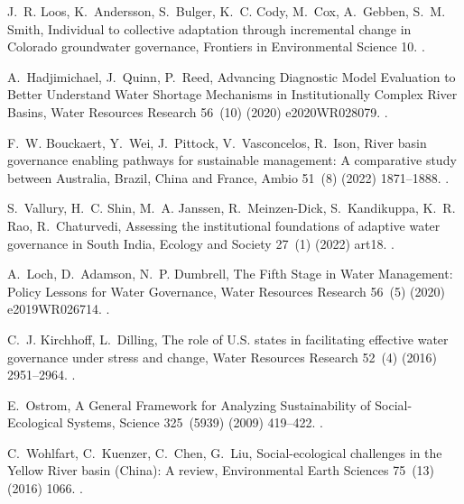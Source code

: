 \documentclass[preprint, 12pt]{elsarticle}
\begin{document}
\begin{thebibliography}{10}
J.~R. Loos, K.~Andersson, S.~Bulger, K.~C. Cody, M.~Cox, A.~Gebben, S.~M.
  Smith, Individual to collective adaptation through incremental change in
  {{Colorado}} groundwater governance, Frontiers in Environmental Science 10.
\newblock \href {http://dx.doi.org/10.3389/fenvs.2022.958597}
  {}.

A.~Hadjimichael, J.~Quinn, P.~Reed, Advancing {{Diagnostic Model Evaluation}}
  to {{Better Understand Water Shortage Mechanisms}} in {{Institutionally
  Complex River Basins}}, Water Resources Research 56~(10) (2020)
  e2020WR028079.
\newblock \href {http://dx.doi.org/10.1029/2020WR028079}
  {}.

F.~W. Bouckaert, Y.~Wei, J.~Pittock, V.~Vasconcelos, R.~Ison, River basin
  governance enabling pathways for sustainable management: {{A}} comparative
  study between {{Australia}}, {{Brazil}}, {{China}} and {{France}}, Ambio
  51~(8) (2022) 1871--1888.
\newblock \href {http://dx.doi.org/10.1007/s13280-021-01699-4}
  {}.

S.~Vallury, H.~C. Shin, M.~A. Janssen, R.~{Meinzen-Dick}, S.~Kandikuppa, K.~R.
  Rao, R.~Chaturvedi, Assessing the institutional foundations of adaptive water
  governance in {{South India}}, Ecology and Society 27~(1) (2022) art18.
\newblock \href {http://dx.doi.org/10.5751/ES-12957-270118}
  {}.

A.~Loch, D.~Adamson, N.~P. Dumbrell, The {{Fifth Stage}} in {{Water
  Management}}: {{Policy Lessons}} for {{Water Governance}}, Water Resources
  Research 56~(5) (2020) e2019WR026714.
\newblock \href {http://dx.doi.org/10.1029/2019WR026714}
  {}.

C.~J. Kirchhoff, L.~Dilling, The role of {{U}}.{{S}}. states in facilitating
  effective water governance under stress and change, Water Resources Research
  52~(4) (2016) 2951--2964.
\newblock \href {http://dx.doi.org/10.1002/2015WR018431}
  {}.

E.~Ostrom, A {{General Framework}} for {{Analyzing Sustainability}} of
  {{Social-Ecological Systems}}, Science 325~(5939) (2009) 419--422.
\newblock \href {http://dx.doi.org/10.1126/science.1172133}
  {}.

C.~Wohlfart, C.~Kuenzer, C.~Chen, G.~Liu, Social-ecological challenges in the
  {{Yellow River}} basin ({{China}}): A review, Environmental Earth Sciences
  75~(13) (2016) 1066.
\newblock \href {http://dx.doi.org/10.1007/s12665-016-5864-2}
  {}.


\end{thebibliography}
\end{document}
